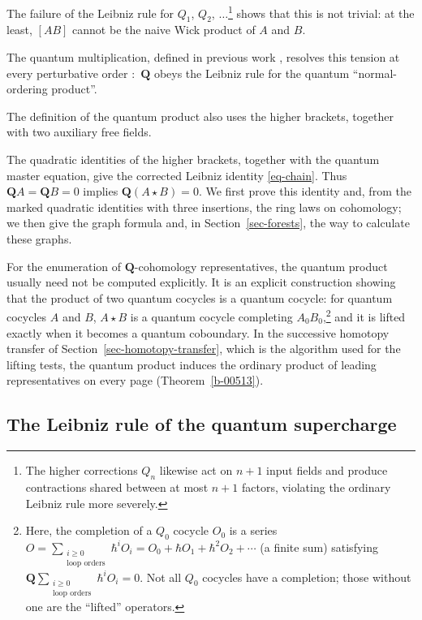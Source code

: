 \documentclass[11pt]{article}
\numberwithin{equation}{section}
\numberwithin{figure}{section}
\numberwithin{table}{section}
\begin{document}
The failure of the Leibniz rule for $Q_1$, $Q_2$, $\ldots$\footnote{The higher corrections $Q_n$ likewise act on $n+1$ input fields and produce contractions shared between at most $n+1$ factors, violating the ordinary Leibniz rule more severely.} shows that this is not trivial: at the least, $[AB]$ cannot be the naive Wick product of $A$ and $B$.

The quantum multiplication, defined in previous work \cite[Sections 4.3 and 4.5]{higher}, resolves this tension at every perturbative order \cite[footnote 28]{semichiral}:~$\mathbf Q$ obeys the Leibniz rule for the quantum ``normal-ordering product''.

The definition of the quantum product also uses the higher brackets, together with two auxiliary free fields.

The quadratic identities of the higher brackets, together with the quantum master equation, give the corrected Leibniz identity \eqref{eq-chain}. Thus $\mathbf QA=\mathbf QB=0$ implies $\mathbf Q(A\star B)=0$. We first prove this identity and, from the marked quadratic identities with three insertions, the ring laws on cohomology; we then give the graph formula and, in Section~\ref{sec-forests}, the way to calculate these graphs.

For the enumeration of $\mathbf Q$-cohomology representatives, the quantum product usually need not be computed explicitly. It is an explicit construction showing that the product of two quantum cocycles is a quantum cocycle: for quantum cocycles $A$ and $B$, $A\star B$ is a quantum cocycle completing $A_0B_0$,\footnote{Here, the completion of a $Q_0$ cocycle $O_0$ is a series $O=\sum_{\substack{i\ge0\\\text{loop orders}}}\hbar^iO_i=O_0+\hbar O_1+\hbar^2O_2+\cdots$ (a finite sum) satisfying $\mathbf Q\sum_{\substack{i\ge0\\\text{loop orders}}}\hbar^iO_i=0$. Not all $Q_0$ cocycles have a completion; those without one are the ``lifted'' operators.} and it is lifted exactly when it becomes a quantum coboundary. In the successive homotopy transfer of Section~\ref{sec-homotopy-transfer}, which is the algorithm used for the lifting tests, the quantum product induces the ordinary product of leading representatives on every page (Theorem~\ref{b-00513}).

\subsection{The Leibniz rule of the quantum supercharge}\label{sec-dressed-chain}
\end{document}
